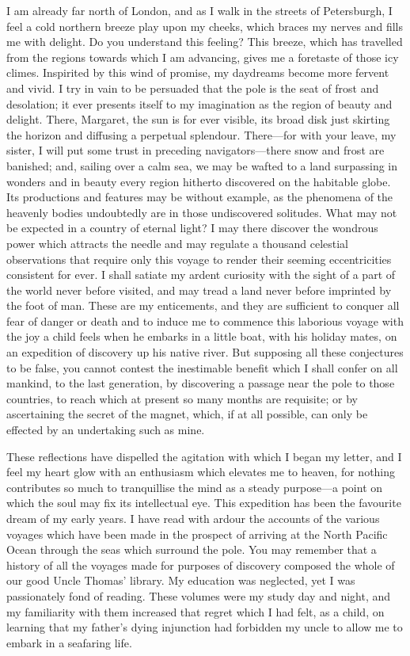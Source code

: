 \documentclass[12pt,openright]{book}
\begin{document}
I am already far north of London, and as I walk in the streets of Petersburgh, I feel a cold northern breeze play upon my cheeks, which braces my nerves and fills me with delight. Do you understand this feeling? This breeze, which has travelled from the regions towards which I am advancing, gives me a foretaste of those icy climes. Inspirited by this wind of promise, my daydreams become more fervent and vivid. I try in vain to be persuaded that the pole is the seat of frost and desolation; it ever presents itself to my imagination as the region of beauty and delight. There, Margaret, the sun is for ever visible, its broad disk just skirting the horizon and diffusing a perpetual splendour. There—for with your leave, my sister, I will put some trust in preceding navigators—there snow and frost are banished; and, sailing over a calm sea, we may be wafted to a land surpassing in wonders and in beauty every region hitherto discovered on the habitable globe. Its productions and features may be without example, as the phenomena of the heavenly bodies undoubtedly are in those undiscovered solitudes. What may not be expected in a country of eternal light? I may there discover the wondrous power which attracts the needle and may regulate a thousand celestial observations that require only this voyage to render their seeming eccentricities consistent for ever. I shall satiate my ardent curiosity with the sight of a part of the world never before visited, and may tread a land never before imprinted by the foot of man. These are my enticements, and they are sufficient to conquer all fear of danger or death and to induce me to commence this laborious voyage with the joy a child feels when he embarks in a little boat, with his holiday mates, on an expedition of discovery up his native river. But supposing all these conjectures to be false, you cannot contest the inestimable benefit which I shall confer on all mankind, to the last generation, by discovering a passage near the pole to those countries, to reach which at present so many months are requisite; or by ascertaining the secret of the magnet, which, if at all possible, can only be effected by an undertaking such as mine.

These reflections have dispelled the agitation with which I began my letter, and I feel my heart glow with an enthusiasm which elevates me to heaven, for nothing contributes so much to tranquillise the mind as a steady purpose—a point on which the soul may fix its intellectual eye. This expedition has been the favourite dream of my early years. I have read with ardour the accounts of the various voyages which have been made in the prospect of arriving at the North Pacific Ocean through the seas which surround the pole. You may remember that a history of all the voyages made for purposes of discovery composed the whole of our good Uncle Thomas’ library. My education was neglected, yet I was passionately fond of reading. These volumes were my study day and night, and my familiarity with them increased that regret which I had felt, as a child, on learning that my father’s dying injunction had forbidden my uncle to allow me to embark in a seafaring life.
\end{document}
